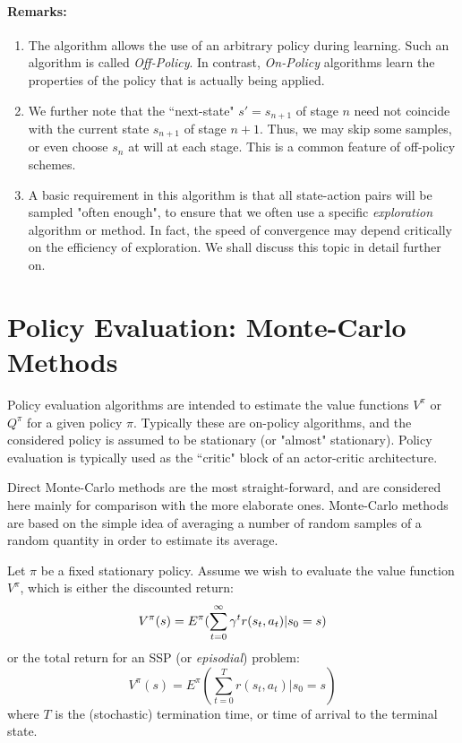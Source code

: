 \paragraph{Remarks:}
\begin{enumerate}
  \item The algorithm allows the use of an arbitrary policy during learning.
Such an algorithm is called {\em Off-Policy}. In contrast, {\em On-Policy}
algorithms learn the properties of the policy that is actually being applied.
  \item We further note that the ``next-state" $s'=s_{n+1}$ of stage $n$ need not
coincide with the current state $s_{n+1}$ of stage $n+1$. Thus, we may skip
some samples, or even choose $s_n$ at will at each stage. This is a common
feature of off-policy schemes.
  \item A basic requirement in this algorithm is that all state-action pairs will
be sampled "often enough", to ensure that we often use a specific
{\em exploration} algorithm or method. In fact, the speed of convergence
may depend critically on the efficiency of exploration. We shall discuss this
topic in detail further on.
\end{enumerate}

\section{Policy Evaluation: Monte-Carlo Methods}

Policy evaluation algorithms are intended to estimate the value functions
$V^\pi$ or $Q^\pi$ for a given policy $\pi$. Typically these are on-policy
algorithms, and the considered policy is assumed to be stationary (or "almost"
stationary). Policy evaluation is typically used as the ``critic" block of an
actor-critic architecture.

Direct Monte-Carlo methods are the most straight-forward, and are considered
here mainly for comparison with the more elaborate ones. Monte-Carlo methods
are based on the simple idea of averaging a number of random samples of a
random quantity in order to estimate its average.

Let $\pi$ be a fixed stationary policy. Assume we wish to evaluate the
value function $V^\pi$, which is either the discounted return:
$$
V^\pi(s) = E^\pi (\sum_{t=0}^\infty \gamma^t r (s_t, a_t) | s_0=s)
$$
or the total return for an SSP (or {\em episodial}) problem:
$$
V^\pi(s) = E^\pi (\sum_{t=0}^T r(s_t, a_t)| s_0=s )
$$
where $T$ is the (stochastic) termination time, or time of arrival to
the terminal state.

